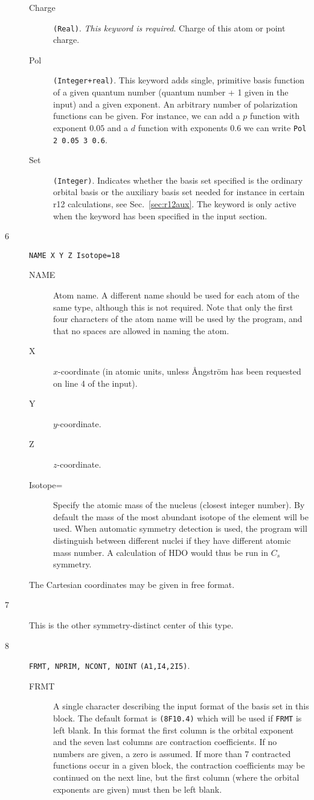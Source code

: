 \begin{description}
\begin{description}
\item[Charge] \verb|(Real)|. {\em This keyword is required\/}.
  Charge of this atom or point charge. 
\item[Pol] \verb|(Integer+real)|. This keyword adds single, primitive
  basis function of a given quantum number (quantum number + 1 given
  in the input) and a given exponent. An arbitrary number of
  polarization functions can be given. For instance, we can add a $p$
  function with exponent $0.05$ and a $d$ function with exponents
  $0.6$ we can write \verb|Pol 2 0.05 3 0.6|.
\item[Set] \verb|(Integer)|. Indicates whether the basis set specified
  is the ordinary orbital basis or the auxiliary basis set needed for
  instance in certain r12 calculations, see
  Sec.~\ref{sec:r12aux}. The keyword is only active when the keyword
   has been specified in the  input section.
\end{description}
\item[6] \verb|NAME X Y Z Isotope=18|
\begin{description}
\item[NAME] Atom name.  A different name should be used for
each atom of the same type, although this is not required. Note that
only the first four characters of the atom name will be used by the
program, and that no spaces are allowed in naming the atom.
\item[X] $x$-coordinate (in atomic units, unless \AA ngstr\"{o}m
has been requested on line 4 of the input).
\item[Y] $y$-coordinate.
\item[Z] $z$-coordinate.
\item[Isotope=]  Specify the atomic mass of the nucleus (closest
  integer number). By default the mass of the most abundant isotope
  of the element will be used. When automatic symmetry detection is
  used, the program will distinguish between different nuclei if they
  have different atomic mass number. A calculation of HDO would thus
  be run in $C_s$ symmetry. 
\end{description}
The Cartesian coordinates may
be given in free format.
\item[7] This is the other symmetry-distinct center of this type.
\item[8] \verb|FRMT, NPRIM, NCONT, NOINT| {\tt (A1,I4,2I5)}.
\begin{description}
\item[FRMT] A single character describing the input format of the
basis set in this block. The default format is {\tt (8F10.4)} which
will be used if {\tt FRMT} is left blank. In this format
the first column is the orbital exponent and the seven last columns
are contraction coefficients. If no numbers are given, a zero is
assumed. If more than 7 contracted functions occur in a given block,
the contraction coefficients may be continued on the next line, but
the first column (where the orbital exponents are given) must then be
left blank.


\end{description}
\end{description}
